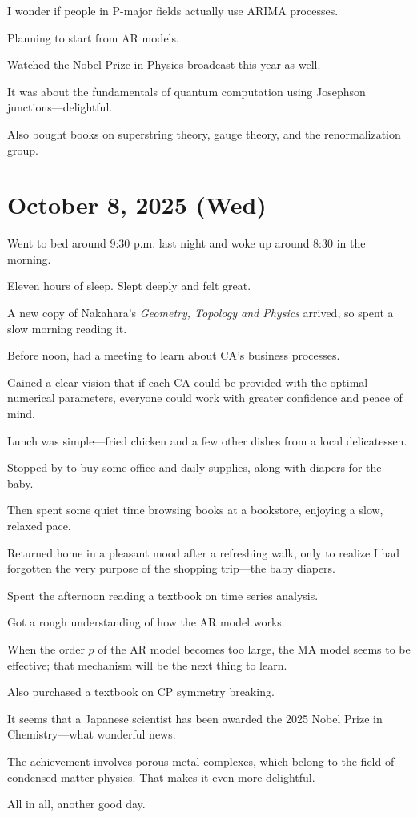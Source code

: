 \documentclass[uplatex]{jsarticle}
\begin{document}
I wonder if people in P-major fields actually use ARIMA processes.

Planning to start from AR models.

Watched the Nobel Prize in Physics broadcast this year as well.

It was about the fundamentals of quantum computation using Josephson junctions—delightful.

Also bought books on superstring theory, gauge theory, and the renormalization group.


\section{October 8, 2025 (Wed)}

Went to bed around 9:30 p.m. last night and woke up around 8:30 in the morning.

Eleven hours of sleep. Slept deeply and felt great.

A new copy of Nakahara's \textit{Geometry, Topology and Physics} arrived, so spent a slow morning reading it.

Before noon, had a meeting to learn about CA's business processes.

Gained a clear vision that if each CA could be provided with the optimal numerical parameters, everyone could work with greater confidence and peace of mind.

Lunch was simple—fried chicken and a few other dishes from a local delicatessen.

Stopped by to buy some office and daily supplies, along with diapers for the baby.

Then spent some quiet time browsing books at a bookstore, enjoying a slow, relaxed pace.

Returned home in a pleasant mood after a refreshing walk, only to realize I had forgotten the very purpose of the shopping trip—the baby diapers.

Spent the afternoon reading a textbook on time series analysis.

Got a rough understanding of how the AR model works.

When the order $p$ of the AR model becomes too large, the MA model seems to be effective; that mechanism will be the next thing to learn.

Also purchased a textbook on CP symmetry breaking.

It seems that a Japanese scientist has been awarded the 2025 Nobel Prize in Chemistry—what wonderful news.

The achievement involves porous metal complexes, which belong to the field of condensed matter physics. That makes it even more delightful.

All in all, another good day.
\end{document}
